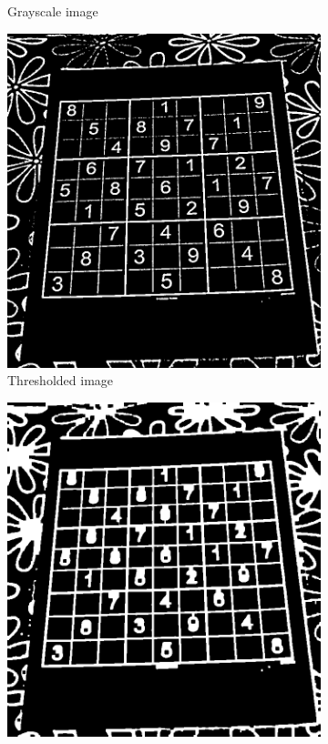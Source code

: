 \documentclass{scrartcl}
\begin{document}
\begin{figure}[!htbp]
\begin{subfigure}[b]{0.3\textwidth}
      \caption{Grayscale image}
    \end{subfigure}
    \begin{subfigure}[b]{0.3\textwidth}
      \centering
      \includegraphics[width=\textwidth]{pictures/results/sudoku/threshold.png}
      \caption{Thresholded image}
    \end{subfigure}
    \vfill
    \begin{subfigure}[b]{0.3\textwidth}
      \centering
      \includegraphics[width=\textwidth]{pictures/results/sudoku/morphology.png}

\end{subfigure}
\end{figure}
\end{document}
